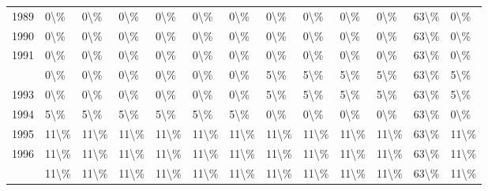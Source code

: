 \begin{table}
\begin{tabular}[t]{rllllllllllll}
1989 & 0\textbackslash{}\% & 0\textbackslash{}\% & 0\textbackslash{}\% & 0\textbackslash{}\% & 0\textbackslash{}\% & 0\textbackslash{}\% & 0\textbackslash{}\% & 0\textbackslash{}\% & 0\textbackslash{}\% & 0\textbackslash{}\% & 63\textbackslash{}\% & 0\textbackslash{}\%\\
1990 & 0\textbackslash{}\% & 0\textbackslash{}\% & 0\textbackslash{}\% & 0\textbackslash{}\% & 0\textbackslash{}\% & 0\textbackslash{}\% & 0\textbackslash{}\% & 0\textbackslash{}\% & 0\textbackslash{}\% & 0\textbackslash{}\% & 63\textbackslash{}\% & 0\textbackslash{}\%\\
1991 & 0\textbackslash{}\% & 0\textbackslash{}\% & 0\textbackslash{}\% & 0\textbackslash{}\% & 0\textbackslash{}\% & 0\textbackslash{}\% & 0\textbackslash{}\% & 0\textbackslash{}\% & 0\textbackslash{}\% & 0\textbackslash{}\% & 63\textbackslash{}\% & 0\textbackslash{}\%\\
\addlinespace
1992 & 0\textbackslash{}\% & 0\textbackslash{}\% & 0\textbackslash{}\% & 0\textbackslash{}\% & 0\textbackslash{}\% & 0\textbackslash{}\% & 5\textbackslash{}\% & 5\textbackslash{}\% & 5\textbackslash{}\% & 5\textbackslash{}\% & 63\textbackslash{}\% & 5\textbackslash{}\%\\
1993 & 0\textbackslash{}\% & 0\textbackslash{}\% & 0\textbackslash{}\% & 0\textbackslash{}\% & 0\textbackslash{}\% & 0\textbackslash{}\% & 5\textbackslash{}\% & 5\textbackslash{}\% & 5\textbackslash{}\% & 5\textbackslash{}\% & 63\textbackslash{}\% & 5\textbackslash{}\%\\
1994 & 5\textbackslash{}\% & 5\textbackslash{}\% & 5\textbackslash{}\% & 5\textbackslash{}\% & 5\textbackslash{}\% & 5\textbackslash{}\% & 0\textbackslash{}\% & 0\textbackslash{}\% & 0\textbackslash{}\% & 0\textbackslash{}\% & 63\textbackslash{}\% & 0\textbackslash{}\%\\
1995 & 11\textbackslash{}\% & 11\textbackslash{}\% & 11\textbackslash{}\% & 11\textbackslash{}\% & 11\textbackslash{}\% & 11\textbackslash{}\% & 11\textbackslash{}\% & 11\textbackslash{}\% & 11\textbackslash{}\% & 11\textbackslash{}\% & 63\textbackslash{}\% & 11\textbackslash{}\%\\
1996 & 11\textbackslash{}\% & 11\textbackslash{}\% & 11\textbackslash{}\% & 11\textbackslash{}\% & 11\textbackslash{}\% & 11\textbackslash{}\% & 11\textbackslash{}\% & 11\textbackslash{}\% & 11\textbackslash{}\% & 11\textbackslash{}\% & 63\textbackslash{}\% & 11\textbackslash{}\%\\
\addlinespace
1997 & 11\textbackslash{}\% & 11\textbackslash{}\% & 11\textbackslash{}\% & 11\textbackslash{}\% & 11\textbackslash{}\% & 11\textbackslash{}\% & 11\textbackslash{}\% & 11\textbackslash{}\% & 11\textbackslash{}\% & 11\textbackslash{}\% & 63\textbackslash{}\% & 11\textbackslash{}\%\\

\end{tabular}
\end{table}
